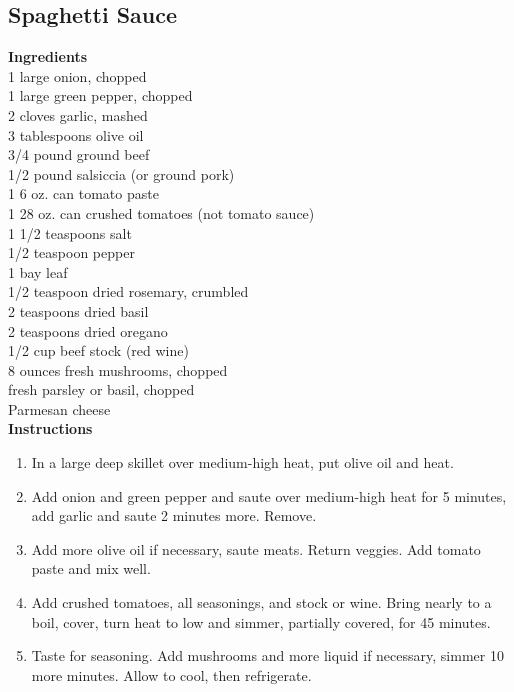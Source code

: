 \documentclass{article}
\numberwithin{figure}{section}
\numberwithin{equation}{section}
\begin{document}
\subsection{Spaghetti Sauce}
{\bf Ingredients}\\
1 large onion, chopped\\
1 large green pepper, chopped\\
2 cloves garlic, mashed\\
3 tablespoons olive oil\\
3/4 pound ground beef\\
1/2 pound salsiccia (or ground pork)\\
1 6 oz. can tomato paste\\
1 28 oz. can crushed tomatoes (not tomato sauce)\\
1 1/2 teaspoons salt\\
1/2 teaspoon pepper\\
1 bay leaf\\
1/2 teaspoon dried rosemary, crumbled\\
2 teaspoons dried basil\\
2 teaspoons dried oregano\\
1/2 cup beef stock (red wine)\\
8 ounces fresh mushrooms, chopped\\

fresh parsley or basil, chopped\\
Parmesan cheese\\

{\bf Instructions}
\begin{enumerate}
\item In a large deep skillet over medium-high heat, put olive oil and heat.

\item Add onion and green pepper and saute over medium-high heat for 5 minutes, add garlic and saute 2 minutes more.  Remove.

\item Add more olive oil if necessary, saute meats.  Return veggies. Add tomato paste and mix well.

\item Add crushed tomatoes, all seasonings, and stock or wine.  Bring nearly to a boil, cover, turn heat to low and simmer, partially covered, for 45 minutes.

\item Taste for seasoning.  Add mushrooms and more liquid if necessary, simmer 10 more minutes.  Allow to cool, then refrigerate.
\end{enumerate}
\end{document}
